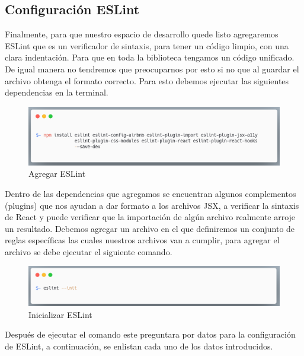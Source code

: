     \subsection{Configuración ESLint }
    Finalmente, para que nuestro espacio de desarrollo quede listo agregaremos ESLint que es un verificador de sintaxis, para tener un código limpio, con una clara indentación. Para que en toda la biblioteca tengamos un código unificado. De igual manera no tendremos que preocuparnos por esto si no que al guardar el archivo obtenga el formato correcto.
    Para esto debemos ejecutar las siguientes dependencias en la terminal.
    \newline
    \newline
     \begin{figure}[H]
    \includegraphics[width=1\textwidth]{./Imagenes/image14.png}
    \caption[Agregar ESLint]{Agregar ESLint}
    \end{figure}
    \newline
    \newline
    Dentro de las dependencias que agregamos se encuentran algunos complementos (plugins) que nos ayudan a dar formato a los archivos JSX, a verificar la sintaxis de React y  puede verificar que la importación de algún archivo realmente arroje un resultado.
    Debemos agregar un archivo en el que definiremos un conjunto de reglas específicas las cuales nuestros archivos van a cumplir, para agregar el archivo se debe ejecutar el siguiente comando.
    \newline
    \newline
     \begin{figure}[H]
    \includegraphics[width=1\textwidth]{./Imagenes/image32.png}
    \caption[Inicializar ESLint]{Inicializar ESLint}
    \end{figure}
    \newline
    \newline
    Después de ejecutar el comando este preguntara por datos para la configuración de ESLint, a continuación, se enlistan cada uno de los datos introducidos.

